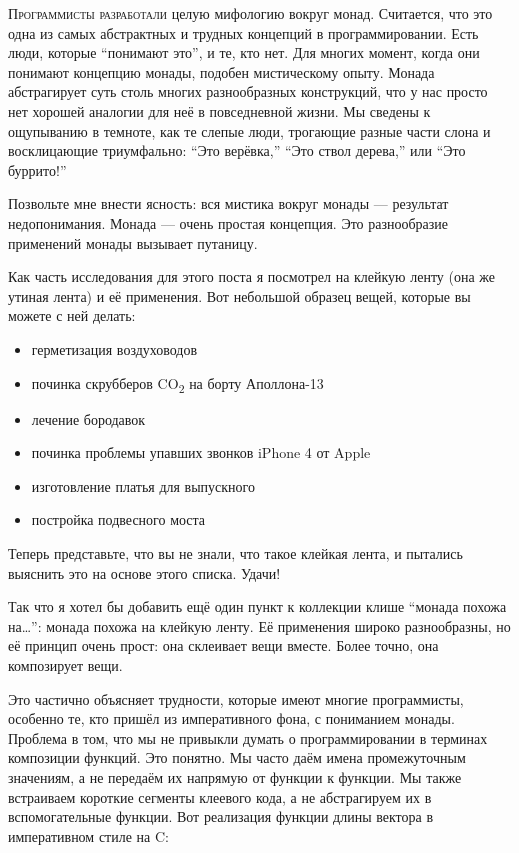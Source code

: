 
\lettrine[lhang=0.17]{П}{рограммисты разработали} целую мифологию вокруг монад. Считается,
что это одна из самых абстрактных и трудных концепций в
программировании. Есть люди, которые ``понимают это'', и те, кто нет. Для
многих момент, когда они понимают концепцию монады, подобен
мистическому опыту. Монада абстрагирует суть столь многих разнообразных
конструкций, что у нас просто нет хорошей аналогии для неё в
повседневной жизни. Мы сведены к ощупыванию в темноте, как те слепые
люди, трогающие разные части слона и восклицающие
триумфально: ``Это верёвка,'' ``Это ствол дерева,'' или ``Это
буррито!''

Позвольте мне внести ясность: вся мистика вокруг монады ---
результат недопонимания. Монада --- очень простая концепция.
Это разнообразие применений монады вызывает
путаницу.

Как часть исследования для этого поста я посмотрел на клейкую ленту (она же
утиная лента) и её применения. Вот небольшой образец вещей, которые вы
можете с ней делать:

\begin{itemize}
  \tightlist
  \item
        герметизация воздуховодов
  \item
        починка скрубберов CO\textsubscript{2} на борту Аполлона-13
  \item
        лечение бородавок
  \item
        починка проблемы упавших звонков iPhone 4 от Apple
  \item
        изготовление платья для выпускного
  \item
        постройка подвесного моста
\end{itemize}

\noindent
Теперь представьте, что вы не знали, что такое клейкая лента, и пытались
выяснить это на основе этого списка. Удачи!

Так что я хотел бы добавить ещё один пункт к коллекции клише ``монада
похожа на\ldots{}'': монада похожа на клейкую ленту. Её применения
широко разнообразны, но её принцип очень прост: она склеивает вещи
вместе. Более точно, она композирует вещи.

Это частично объясняет трудности, которые имеют многие программисты,
особенно те, кто пришёл из императивного фона, с
пониманием монады. Проблема в том, что мы не привыкли думать
о программировании в терминах композиции функций. Это понятно.
Мы часто даём имена промежуточным значениям, а не передаём их
напрямую от функции к функции. Мы также встраиваем короткие сегменты
клеевого кода, а не абстрагируем их в вспомогательные функции. Вот
реализация функции длины вектора в императивном стиле на C:

